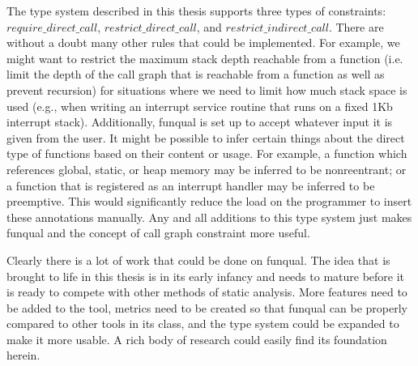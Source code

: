 The type system described in this thesis supports three types of constraints: $require\_direct\_call$, $restrict\_direct\_call$, and $restrict\_indirect\_call$.  There are without a doubt many other rules that could be implemented.  For example, we might want to restrict the maximum stack depth reachable from a function (i.e. limit the depth of the call graph that is reachable from a function as well as prevent recursion) for situations where we need to limit how much stack space is used (e.g., when writing an interrupt service routine that runs on a fixed 1Kb interrupt stack).  Additionally, funqual is set up to accept whatever input it is given from the user.  It might be possible to infer certain things about the direct type of functions based on their content or usage.  For example, a function which references global, static, or heap memory may be inferred to be nonreentrant; or a function that is registered as an interrupt handler may be inferred to be preemptive.  This would significantly reduce the load on the programmer to insert these annotations manually.  Any and all additions to this type system just makes funqual and the concept of call graph constraint more useful.

Clearly there is a lot of work that could be done on funqual.  The idea that is brought to life in this thesis is in its early infancy and needs to mature before it is ready to compete with other methods of static analysis.  More features need to be added to the tool, metrics need to be created so that funqual can be properly compared to other tools in its class, and the type system could be expanded to make it more usable.  A rich body of research could easily find its foundation herein.  

